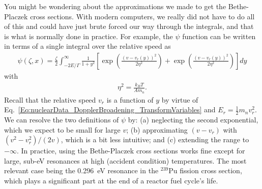 You might be wondering about the approximations we made to get the Bethe-Placzek cross sections. With modern computers, we really did not have to do all of this and could have just brute forced our way through the integrals, and that is what is normally done in practice. For example, the $\psi$ function can be written in terms of a single integral over the relative speed as
\begin{align}
  \psi(\zeta,x) = \frac{\zeta}{2} \int_{-2E/\Gamma}^\infty \frac{1}{1 + y^2} 
  \left[ \exp\left( \frac{(v - v_r(y))^2}{2\eta^2} \right) + \exp\left( \frac{(v - v_r(y))^2}{2\eta^2} \right) \right] dy
\end{align}
with
\begin{align}
  \eta^2 = \frac{ k_B T }{ A m_n } .
\end{align}
Recall that the relative speed $v_r$ is a function of $y$ by virtue of Eq.~\eqref{Eq:nuclearData_DopplerBroadening_TransformVariables} and $E_r = \frac{1}{2} m_n v_r^2$. We can resolve the two definitions of $\psi$ by: (a) neglecting the second exponential, which we expect to be small for large $v$; (b) approximating $( v - v_r )$ with $( v^2 - v_r^2 )/(2v)$, which is a bit less intuitive; and (c) extending the range to $-\infty$. In practice, using the Bethe-Placzek cross sections works fine except for large, sub-eV resonances at high (accident condition) temperatures. The most relevant case being the 0.296~eV resonance in the $^{239}$Pu fission cross section, which plays a significant part at the end of a reactor fuel cycle's life. 